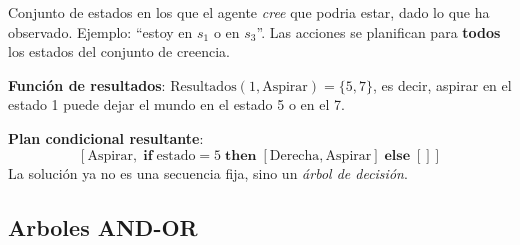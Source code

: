 \begin{definition}
    Conjunto de estados en los que el agente \emph{cree} que podria estar, dado lo que ha observado. Ejemplo: ``estoy en $s_1$ o en
    $s_3$''. Las acciones se planifican para \textbf{todos} los estados
    del conjunto de creencia.

\end{definition}



\begin{example}
    \textbf{Función de resultados}:
    $\mathrm{Resultados}(1, \text{Aspirar}) = \{5, 7\}$, es decir,
    aspirar en el estado 1 puede dejar el mundo en el estado 5 o en el 7.
   
    \medskip
    \textbf{Plan condicional resultante}:
    \[
      [\text{Aspirar},\; \textbf{if}\; \text{estado} = 5\;
       \textbf{then}\; [\text{Derecha}, \text{Aspirar}]\;
       \textbf{else}\; []]
    \]
    La solución ya no es una secuencia fija, sino un \emph{árbol de decisión}.
  \end{example}

\subsection{Arboles AND-OR}

